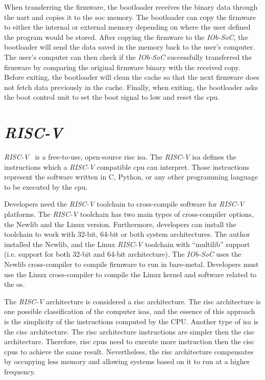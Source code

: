 When transferring the firmware, the bootloader receives the binary data through the \acrshort{uart} and copies it to the \acrshort{soc} memory. The bootloader can copy the firmware to either the internal or external memory depending on where the user defined the program would be stored. After copying the firmware to the \textit{IOb-SoC}, the bootloader will send the data saved in the memory back to the user's computer. The user's computer can then check if the \textit{IOb-SoC} successfully transferred the firmware by comparing the original firmware binary with the received copy. Before exiting, the bootloader will clean the cache so that the next firmware does not fetch data previously in the cache. Finally, when exiting, the bootloader asks the boot control unit to set the boot signal to low and reset the \acrshort{cpu}.

\section{\textit{RISC-V}}
\label{section:riscv}
\textit{RISC-V}~\cite{asanovic2014instruction} is a free-to-use, open-source \acrshort{risc} \acrfull{isa}. The \textit{RISC-V} \acrlong{isa} defines the instructions which a \textit{RISC-V} compatible \acrshort{cpu} can interpret. Those instructions represent the software written in C, Python, or any other programming language to be executed by the \acrshort{cpu}.

Developers need the \textit{RISC-V} toolchain to cross-compile software for \textit{RISC-V} platforms. The \textit{RISC-V} toolchain has two main types of cross-compiler options, the Newlib and the Linux version. Furthermore, developers can install the toolchain to work with 32-bit, 64-bit or both system architectures. The author installed the Newlib, and the Linux \textit{RISC-V} toolchain with \enquote{multilib} support (i.e. support for both 32-bit and 64-bit architecture). The \textit{IOb-SoC} uses the Newlib cross-compiler to compile firmware to run in bare-metal. Developers must use the Linux cross-compiler to compile the Linux kernel and software related to the \acrshort{os}.

The \textit{RISC-V} architecture is considered a \acrshort{risc} architecture. The \acrfull{risc} architecture is one possible classification of the computer \acrshort{isa}s, and the essence of this approach is the simplicity of the instructions computed by the CPU. Another type of \acrshort{isa} is the \acrfull{cisc} architecture. The \acrshort{risc} architecture instructions are simpler then the \acrshort{cisc} architecture. Therefore, \acrshort{risc} \acrshort{cpu}s need to execute more instruction then the \acrshort{cisc} \acrshort{cpu}s to achieve the same result. Nevertheless, the \acrshort{risc} architecture compensates by occupying less memory and allowing systems based on it to run at a higher frequency.

